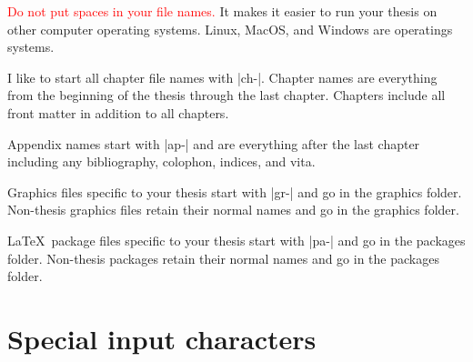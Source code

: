 \textcolor{red}{Do not put spaces in your file names.}
It makes it easier to run your thesis on other computer operating systems.
Linux, MacOS, and Windows are operatings systems.

I like
to start all chapter file names with |ch-|.
Chapter names are everything
from the beginning of the thesis through the last chapter.
Chapters include all front matter in addition
to all chapters.

Appendix names start with |ap-|
and are everything after the last chapter including any bibliography,
colophon,
indices,
and vita.

Graphics files specific to your thesis start
with |gr-| and go in the graphics folder.
Non-thesis graphics files retain their normal names
and go in the graphics folder.

\LaTeX\ package files specific to your thesis  start
with |pa-| and go in the packages folder.
Non-thesis packages retain their normal names
and go in the packages folder.


\section{Special input characters}


